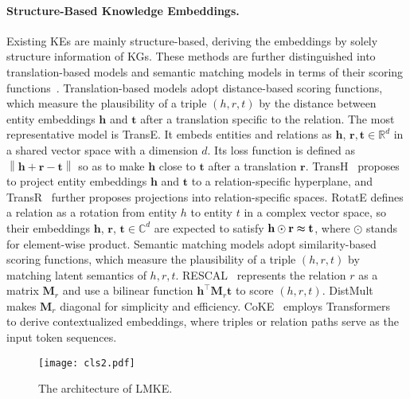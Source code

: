 \documentclass{article}
\begin{document}
\paragraph{\textbf{Structure-Based Knowledge Embeddings.}}  
Existing KEs are mainly structure-based, deriving the embeddings by solely structure information of KGs.
These methods are further distinguished into translation-based models and semantic matching models in terms of their scoring functions~\cite{wang2017knowledge}. 
Translation-based models adopt distance-based scoring functions, which measure the plausibility of a triple $(h, r, t)$  by the distance between entity embeddings $\textbf{h}$ and $\textbf{t}$ after a translation specific to the relation.   
The most representative model is TransE. 
It embeds entities and relations as $\textbf{h}$, $\textbf{r}, \textbf{t}\in\mathbb{R}^{d}$ in a shared vector space with a dimension $d$.
Its loss function is defined as $\left\lVert \textbf{h}+\textbf{r}-\textbf{t} \right\rVert$ so as to make $\textbf{h}$ close to $\textbf{t}$ after a translation $\textbf{r}$. 
TransH~\cite{wang2014transh} proposes to project entity embeddings $\textbf{h}$ and $\textbf{t}$ to a relation-specific hyperplane, and TransR~\cite{lin2015transr} further proposes projections into relation-specific spaces.
RotatE defines a relation as a rotation from entity $h$ to entity $t$ in a complex vector space, so their embeddings $\textbf{h}$, $\textbf{r}$, $\textbf{t}\in\mathbb{C}^{d}$ are expected to satisfy $\textbf{h}\odot\textbf{r}\thickapprox\textbf{t}$, where $\odot$ stands for element-wise product.
Semantic matching models adopt similarity-based scoring functions, which measure the plausibility of a triple $(h, r, t)$ by matching latent semantics of $h, r, t$.
RESCAL~\cite{nickel2011rescal} represents the relation $r$ as a matrix $\textbf{M}_{r}$ and use a bilinear function $\textbf{h}^{\top}\textbf{M}_{r}\textbf{t}$ to score $(h, r, t)$. 
DistMult~\cite{yang2014distmult} makes $\textbf{M}_{r}$ diagonal for simplicity and efficiency. 
CoKE~\cite{wang2019coke} employs Transformers~\cite{vaswani2017attention} to derive contextualized embeddings, where triples or relation paths serve as the input token sequences. 


\begin{figure*}[htbp]
  \centering
  \texttt{[image: cls2.pdf]}
\caption{The architecture of LMKE.}
  \label{fig:triple_classification}
\end{figure*}
\end{document}
